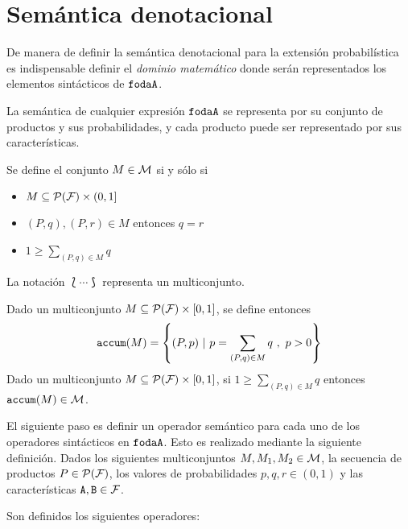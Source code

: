 \section{Semántica denotacional}

De manera de definir la semántica denotacional para la extensión
probabilística es indispensable definir el \emph{dominio matemático}
donde serán representados los elementos sintácticos de $\mathtt{fodaA}$. 

La semántica de cualquier expresión $\mathtt{fodaA}$
se representa por su conjunto de productos y sus probabilidades,
y cada producto puede ser representado por  sus características.

\bdfn
  Se define el conjunto $M\in{\cal M}$ si y sólo si
  \begin{itemize}
  \item $M\subseteq {\cal P}({\cal F})\times (0,1]$
  \item $(P,q),(P,r)\in M$ entonces $q=r$
  \item $1\geq\sum_{(P,q)\in M} q$
  \end{itemize}
\edfn

La notación $\lbag \cdots\rbag$ representa un multiconjunto.

\bdfn
  Dado un multiconjunto $M\subseteq {\cal P}({\cal F})\times [0,1]$, se define entonces
  $$\mathtt{accum}(M) = \left\{(P,p)\ | \ p=\sum_{(P,q)\in M}q\ ,\ p>0\right\}$$
\edfn
\bprop
 Dado un multiconjunto $M\subseteq {\cal P}({\cal F})\times [0,1]$, si $1\geq\sum_{(P,q)\in M} q$
 entonces $\mathtt{accum}(M)\in{\cal M}$.
\eprop

El siguiente paso es definir un operador semántico para cada uno de los
operadores sintácticos en $\mathtt{fodaA}$.
Esto es realizado mediante la siguiente definición.
\bdfn\label{def:semantic:operators}
  Dados los siguientes multiconjuntos $M,M_{1}, M_{2}\in{\cal M}$,
  la secuencia de productos $P \in {\cal P}({\cal F})$,
  los valores de probabilidades $p,q,r \in (0,1)$ y
  las características $\mathtt{A},\mathtt{B}\in{\cal F}$.

  Son definidos los siguientes operadores:

